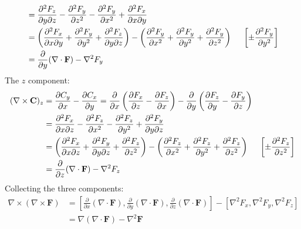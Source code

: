 \begin{enumerate}
\begin{align*}
      &= \frac{\partial^2 F_z}{\partial y \partial z} - \frac{\partial^2 F_y}{\partial z^2} - \frac{\partial^2 F_y}{\partial x^2} + \frac{\partial^2 F_x}{\partial x \partial y} \\
      &= \left(\frac{\partial^2 F_x}{\partial x \partial y} + \frac{\partial^2 F_y}{\partial y^2} + \frac{\partial^2 F_z}{\partial y \partial z}\right) - \left(\frac{\partial^2 F_y}{\partial x^2} + \frac{\partial^2 F_y}{\partial y^2} + \frac{\partial^2 F_y}{\partial z^2}\right) \hspace{0.5cm} \left[\pm\frac{\partial^2 F_y}{\partial y^2}\right] \\
      &= \frac{\partial}{\partial y}(\nabla \cdot \mathbf{F}) - \nabla^2 F_y
    \end{align*}
    The \(z\) component:
    \begin{align*}
      (\nabla \times \mathbf{C})_z &= \frac{\partial C_y}{\partial x} - \frac{\partial C_x}{\partial y}
        = \frac{\partial}{\partial x}\left(\frac{\partial F_x}{\partial z} - \frac{\partial F_z}{\partial x}\right) - \frac{\partial}{\partial y}\left(\frac{\partial F_z}{\partial y} - \frac{\partial F_y}{\partial z}\right) \\
      &= \frac{\partial^2 F_x}{\partial x \partial z} - \frac{\partial^2 F_z}{\partial x^2} - \frac{\partial^2 F_z}{\partial y^2} + \frac{\partial^2 F_y}{\partial y \partial z} \\
      &= \left(\frac{\partial^2 F_x}{\partial x \partial z} + \frac{\partial^2 F_y}{\partial y \partial z} + \frac{\partial^2 F_z}{\partial z^2}\right) - \left(\frac{\partial^2 F_z}{\partial x^2} + \frac{\partial^2 F_z}{\partial y^2} + \frac{\partial^2 F_z}{\partial z^2}\right) \hspace{0.5cm} \left[\pm\frac{\partial^2 F_z}{\partial z^2}\right] \\
      &= \frac{\partial}{\partial z}(\nabla \cdot \mathbf{F}) - \nabla^2 F_z
    \end{align*}
    Collecting the three components:
    \begin{align*}
      \nabla \times (\nabla \times \mathbf{F}) &= \left[\frac{\partial}{\partial x}(\nabla \cdot \mathbf{F}), \frac{\partial}{\partial y}(\nabla \cdot \mathbf{F}), \frac{\partial}{\partial z}(\nabla \cdot \mathbf{F})\right] - \left[\nabla^2 F_x, \nabla^2 F_y, \nabla^2 F_z\right] \\
      &= \nabla(\nabla \cdot \mathbf{F}) - \nabla^2 \mathbf{F}
    \end{align*}
\end{enumerate}
